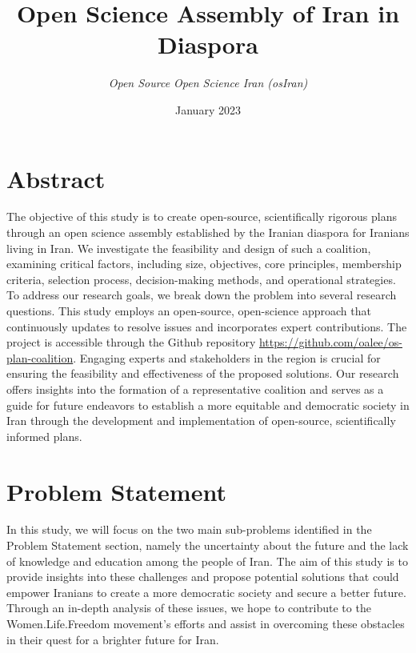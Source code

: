\documentclass{IEEEtran}
\title{ \Huge \textbf{Open Science Assembly of Iran in Diaspora} \\[0.5cm]}
\author{

\textit{Open Source Open Science Iran (osIran)} \\
}
\date{January 2023}
\newcommand{\note}[1]{\todo[inline]{#1}}
\begin{document}
\maketitle




\section{Abstract}
The objective of this study is to create open-source, scientifically rigorous plans through an open science assembly established by the Iranian diaspora for Iranians living in Iran. We investigate the feasibility and design of such a coalition, examining critical factors, including size, objectives, core principles, membership criteria, selection process, decision-making methods, and operational strategies. To address our research goals, we break down the problem into several research questions.
This study employs an open-source, open-science approach that continuously updates to resolve issues and incorporates expert contributions. The project is accessible through the Github repository \url{https://github.com/oalee/os-plan-coalition}. Engaging experts and stakeholders in the region is crucial for ensuring the feasibility and effectiveness of the proposed solutions.
Our research offers insights into the formation of a representative coalition and serves as a guide for future endeavors to establish a more equitable and democratic society in Iran through the development and implementation of open-source, scientifically informed plans.


\section{Problem Statement}

In this study, we will focus on the two main sub-problems identified in the Problem Statement section, namely the uncertainty about the future and the lack of knowledge and education among the people of Iran. The aim of this study is to provide insights into these challenges and propose potential solutions that could empower Iranians to create a more democratic society and secure a better future. Through an in-depth analysis of these issues, we hope to contribute to the Women.Life.Freedom movement's efforts and assist in overcoming these obstacles in their quest for a brighter future for Iran.
\end{document}
